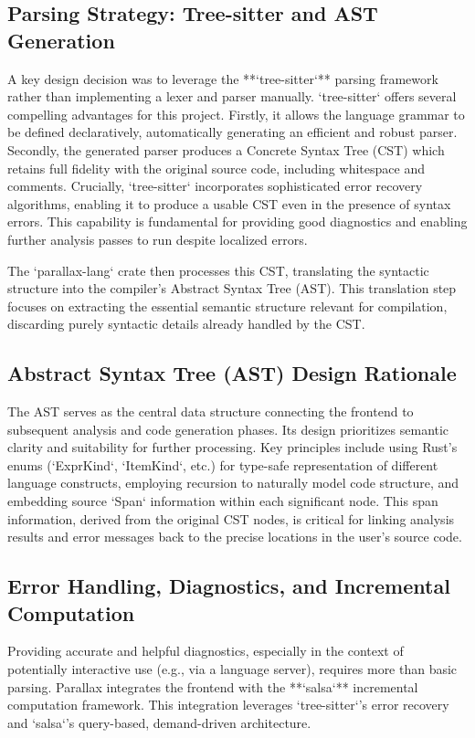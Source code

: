 \subsection{Parsing Strategy: Tree-sitter and AST Generation} %
A key design decision was to leverage the **`tree-sitter`** parsing framework rather than implementing a lexer and parser manually. `tree-sitter` offers several compelling advantages for this project. Firstly, it allows the language grammar to be defined declaratively, automatically generating an efficient and robust parser. Secondly, the generated parser produces a Concrete Syntax Tree (CST) which retains full fidelity with the original source code, including whitespace and comments. Crucially, `tree-sitter` incorporates sophisticated error recovery algorithms, enabling it to produce a usable CST even in the presence of syntax errors. This capability is fundamental for providing good diagnostics and enabling further analysis passes to run despite localized errors.

The `parallax-lang` crate then processes this CST, translating the syntactic structure into the compiler's Abstract Syntax Tree (AST). This translation step focuses on extracting the essential semantic structure relevant for compilation, discarding purely syntactic details already handled by the CST.

\subsection{Abstract Syntax Tree (AST) Design Rationale} %
The AST serves as the central data structure connecting the frontend to subsequent analysis and code generation phases. Its design prioritizes semantic clarity and suitability for further processing. Key principles include using Rust's enums (`ExprKind`, `ItemKind`, etc.) for type-safe representation of different language constructs, employing recursion to naturally model code structure, and embedding source `Span` information within each significant node. This span information, derived from the original CST nodes, is critical for linking analysis results and error messages back to the precise locations in the user's source code.

\subsection{Error Handling, Diagnostics, and Incremental Computation} %
Providing accurate and helpful diagnostics, especially in the context of potentially interactive use (e.g., via a language server), requires more than basic parsing. Parallax integrates the frontend with the **`salsa`** incremental computation framework. This integration leverages `tree-sitter`'s error recovery and `salsa`'s query-based, demand-driven architecture.

